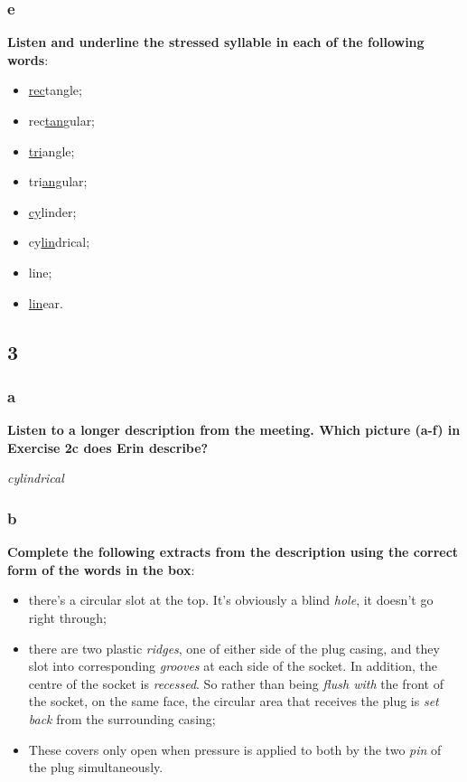 \subsubsection{e}

\textbf{Listen and underline the stressed syllable in each of the following words}:

\begin{itemize}

\item \underline{rec}tangle;
\item rec\underline{tan}gular;
\item \underline{tri}angle;
\item tri\underline{ang}ular;
\item \underline{cy}linder;
\item cy\underline{lin}drical;
\item line;
\item \underline{lin}ear.

\end{itemize}

\subsection{3}

\subsubsection{a}

\textbf{Listen to a longer description from the meeting. Which picture (a-f) in Exercise 2c does Erin describe?}

\textit{cylindrical} 

\subsubsection{b}

\textbf{Complete the following extracts from the description using the correct form of the words in the box}:

\begin{itemize}

\item  there's a circular slot at the top. It's obviously a blind \textit{hole}, it doesn't go right through;
\item there are two plastic \textit{ridges}, one of either side of the plug casing, and they slot into corresponding \textit{grooves} at each side of the socket. In addition, the centre of the socket is \textit{recessed}. So rather than being \textit{flush with} the front of the socket, on the same face, the circular area that receives the plug is \textit{set back} from the surrounding casing;
\item These covers only open when pressure is applied to both by the two \textit{pin} of the plug simultaneously.

\end{itemize}

